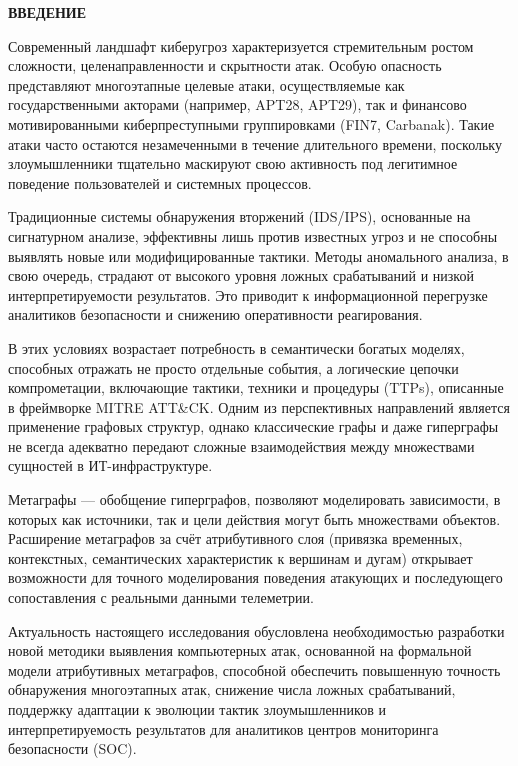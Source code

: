 
\thispagestyle{plain}
\begin{center}
\textbf{\large ВВЕДЕНИЕ}
\end{center}

\vspace{1em}

Современный ландшафт киберугроз характеризуется стремительным ростом сложности, целенаправленности и скрытности атак. Особую опасность представляют многоэтапные целевые атаки, осуществляемые как государственными акторами (например, APT28, APT29), так и финансово мотивированными киберпреступными группировками (FIN7, Carbanak). Такие атаки часто остаются незамеченными в течение длительного времени, поскольку злоумышленники тщательно маскируют свою активность под легитимное поведение пользователей и системных процессов.

Традиционные системы обнаружения вторжений (IDS/IPS), основанные на сигнатурном анализе, эффективны лишь против известных угроз и не способны выявлять новые или модифицированные тактики. Методы аномального анализа, в свою очередь, страдают от высокого уровня ложных срабатываний и низкой интерпретируемости результатов. Это приводит к информационной перегрузке аналитиков безопасности и снижению оперативности реагирования.

В этих условиях возрастает потребность в семантически богатых моделях, способных отражать не просто отдельные события, а логические цепочки компрометации, включающие тактики, техники и процедуры (TTPs), описанные в фреймворке MITRE ATT\&CK. Одним из перспективных направлений является применение графовых структур, однако классические графы и даже гиперграфы не всегда адекватно передают сложные взаимодействия между множествами сущностей в ИТ-инфраструктуре.

Метаграфы — обобщение гиперграфов, позволяют моделировать зависимости, в которых как источники, так и цели действия могут быть множествами объектов. Расширение метаграфов за счёт атрибутивного слоя (привязка временных, контекстных, семантических характеристик к вершинам и дугам) открывает возможности для точного моделирования поведения атакующих и последующего сопоставления с реальными данными телеметрии.

Актуальность настоящего исследования обусловлена необходимостью разработки новой методики выявления компьютерных атак, основанной на формальной модели атрибутивных метаграфов, способной обеспечить повышенную точность обнаружения многоэтапных атак, снижение числа ложных срабатываний, поддержку адаптации к эволюции тактик злоумышленников и интерпретируемость результатов для аналитиков центров мониторинга безопасности (SOC).

